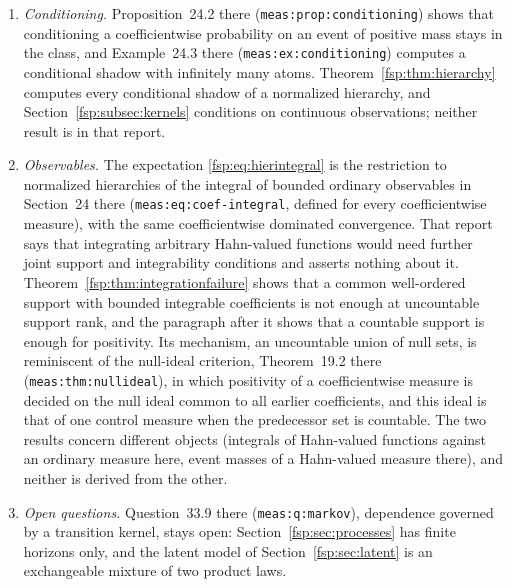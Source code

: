 \documentclass[11pt,a4paper]{article}
\numberwithin{equation}{section}
\theoremstyle{definition}
\theoremstyle{remark}
\begin{document}
\begin{enumerate}[label=(\alph*)]
$2n$, where Theorem~\ref{fsp:thm:rarecoin} uses the first-success events, and
for an interior bias the variation grows like $\sqrt n$ by H\"older's inequality
and fourth-power expectations, Lemma~20.3 there (\nolinkurl{meas:lem:L1lower}),
as in the proof of Theorem~\ref{fsp:thm:faircoin}. Neither coin law has a strong
extension either (Corollary~10.3 and Example~10.4 there,
\nolinkurl{meas:cor:bernoulli}, \nolinkurl{meas:ex:bernoulli}).
Corollary~\ref{fsp:cor:coinextension} adds what that report leaves aside: its
non-claims 10.1 and 15.1 (Section~32.2 there, \nolinkurl{meas:sub:nonclaims})
say that its negative results do not exclude finitely additive or ultrafilter
probability, and Corollary~\ref{fsp:cor:coinextension} gives both coin models
regular finitely additive laws on all subsets.
\item \emph{Conditioning.} Proposition~24.2 there
(\nolinkurl{meas:prop:conditioning}) shows that conditioning a coefficientwise
probability on an event of positive mass stays in the class, and Example~24.3
there (\nolinkurl{meas:ex:conditioning}) computes a conditional shadow with
infinitely many atoms. Theorem~\ref{fsp:thm:hierarchy} computes every
conditional shadow of a normalized hierarchy, and Section~\ref{fsp:subsec:kernels}
conditions on continuous observations; neither result is in that report.
\item \emph{Observables.} The expectation \eqref{fsp:eq:hierintegral} is the
restriction to normalized hierarchies of the integral of bounded ordinary
observables in Section~24 there (\nolinkurl{meas:eq:coef-integral}, defined for
every coefficientwise measure), with the same coefficientwise dominated
convergence. That report says that integrating arbitrary Hahn-valued functions
would need further joint support and integrability conditions and asserts
nothing about it. Theorem~\ref{fsp:thm:integrationfailure} shows that a common
well-ordered support with bounded integrable coefficients is not enough at
uncountable support rank, and the paragraph after it shows that a countable
support is enough for positivity. Its mechanism, an uncountable union of null
sets, is reminiscent of the null-ideal criterion, Theorem~19.2 there
(\nolinkurl{meas:thm:nullideal}), in which positivity of a coefficientwise
measure is decided on the null ideal common to all earlier coefficients, and
this ideal is that of one control measure when the predecessor set is countable.
The two results concern different objects (integrals of Hahn-valued functions
against an ordinary measure here, event masses of a Hahn-valued measure there),
and neither is derived from the other.
\item \emph{Open questions.} Question~33.9 there (\nolinkurl{meas:q:markov}),
dependence governed by a transition kernel, stays open: Section~\ref{fsp:sec:processes}
has finite horizons only, and the latent model of Section~\ref{fsp:sec:latent} is an
exchangeable mixture of two product laws.
\end{enumerate}
\end{document}
